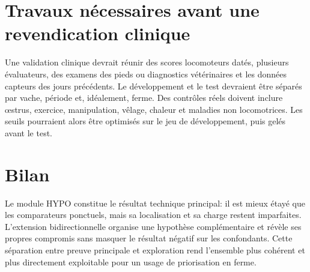 \section{Travaux nécessaires avant une revendication clinique}

Une validation clinique devrait réunir des scores locomoteurs datés, plusieurs évaluateurs,
des examens des pieds ou diagnostics vétérinaires et les données capteurs des jours
précédents. Le développement et le test devraient être séparés par vache, période et,
idéalement, ferme. Des contrôles réels doivent inclure œstrus, exercice, manipulation,
vêlage, chaleur et maladies non locomotrices. Les seuils pourraient alors être optimisés sur
le jeu de développement, puis gelés avant le test.

\section{Bilan}

Le module HYPO constitue le résultat technique principal: il est mieux étayé que les
comparateurs ponctuels, mais sa localisation et sa charge restent imparfaites. L'extension
bidirectionnelle organise une hypothèse complémentaire et révèle ses propres compromis sans
masquer le résultat négatif sur les confondants. Cette séparation entre preuve principale et
exploration rend l'ensemble plus cohérent et plus directement exploitable pour un usage de
priorisation en ferme.
